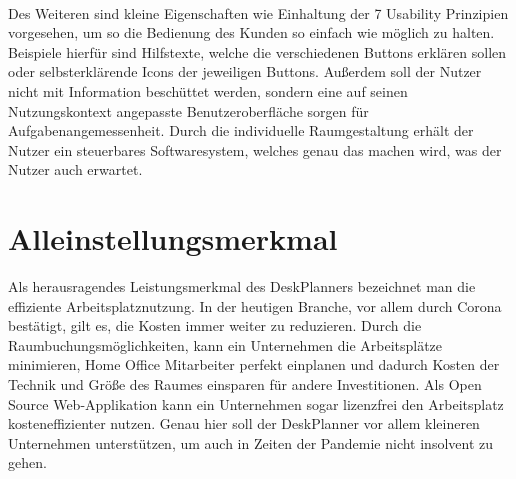 \paragraph{} Des Weiteren sind kleine Eigenschaften wie Einhaltung der 7 Usability Prinzipien vorgesehen, um so die Bedienung des Kunden so einfach wie möglich zu halten. 
Beispiele hierfür sind Hilfstexte, welche die verschiedenen Buttons erklären sollen oder selbsterklärende Icons der jeweiligen Buttons. 
Außerdem soll der Nutzer nicht mit Information beschüttet werden, sondern eine auf seinen Nutzungskontext angepasste Benutzeroberfläche sorgen für Aufgabenangemessenheit. 
Durch die individuelle Raumgestaltung erhält der Nutzer ein steuerbares Softwaresystem, welches genau das machen wird, was der Nutzer auch erwartet.

\section{Alleinstellungsmerkmal}
Als herausragendes Leistungsmerkmal des DeskPlanners bezeichnet man die effiziente Arbeitsplatznutzung. 
In der heutigen Branche, vor allem durch Corona bestätigt, gilt es, die Kosten immer weiter zu reduzieren. 
Durch die Raumbuchungsmöglichkeiten, kann ein Unternehmen die Arbeitsplätze minimieren, Home Office Mitarbeiter perfekt einplanen und dadurch Kosten der Technik und Größe des Raumes einsparen für andere Investitionen. 
Als Open Source Web-Applikation kann ein Unternehmen sogar lizenzfrei den Arbeitsplatz kosteneffizienter nutzen.
Genau hier soll der DeskPlanner vor allem kleineren Unternehmen unterstützen, um auch in Zeiten der Pandemie nicht insolvent zu gehen.

